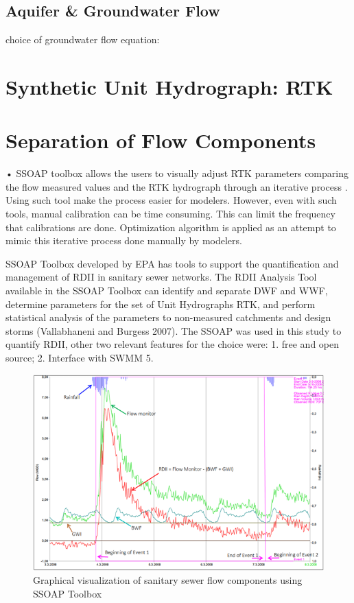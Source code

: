 
\subsection{Aquifer \& Groundwater Flow} \label{groundwater}
 
choice of groundwater flow equation:


\section{Synthetic Unit Hydrograph: RTK}




\section{Separation of Flow Components}

•	SSOAP toolbox allows the users to visually adjust RTK parameters comparing the flow measured values and the RTK hydrograph through an iterative process \cite{Vallabhaneni2007}. Using such tool make the process easier for modelers. However, even with such tools, manual calibration can be time consuming. This can limit the frequency that calibrations are done. Optimization algorithm is applied as an attempt to mimic this iterative process done manually by modelers.

SSOAP Toolbox developed by \ac{EPA} has tools to support the quantification and management of RDII in sanitary sewer networks. The RDII Analysis Tool available in the SSOAP Toolbox can identify and separate DWF and WWF, determine parameters for the set of Unit Hydrographs RTK, and perform statistical analysis of the parameters to non-measured catchments and design storms (Vallabhaneni and Burgess 2007). The SSOAP was used in this study to quantify RDII, other two relevant features for the choice were: 1. free and open source; 2. Interface with SWMM 5.


\begin{figure}[ht]
    \centering
	\includegraphics[scale=1.2]{figures/SSOAP_example.png}
	\caption{Graphical visualization of sanitary sewer flow components using SSOAP Toolbox}
	\label{fig:SSOAPexample}
\end{figure}
